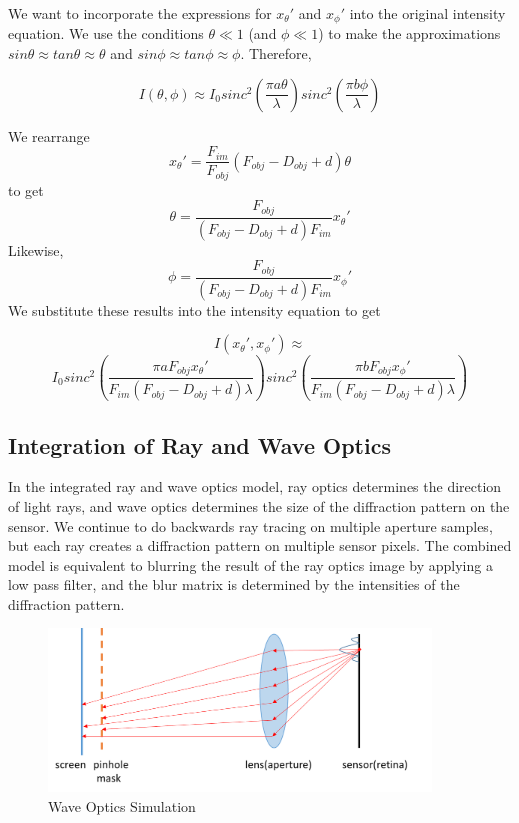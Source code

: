 We want to incorporate the expressions for $x_{\theta}'$ and $x_{\phi}'$ into the original intensity equation. We use the conditions $\theta \ll 1$ (and $\phi \ll 1$) to make the approximations $sin\theta \approx tan\theta \approx \theta$ and $sin\phi \approx tan\phi \approx \phi$. Therefore, 

$$I(\theta, \phi) \approx I_0 sinc^2(\frac{\pi a \theta}{\lambda}) sinc^2(\frac{\pi b \phi}{\lambda})$$

We rearrange $$x_{\theta}' = \frac{F_{im}}{F_{obj}} (F_{obj} - D_{obj} + d) \theta $$ to get $$\theta =  \frac{F_{obj}} {(F_{obj} - D_{obj} + d)F_{im}} x_{\theta}'$$ Likewise,  $$\phi =  \frac{F_{obj}} {(F_{obj} - D_{obj} + d)F_{im}} x_{\phi}'$$ We substitute these results into the intensity equation to get

$$I(x_{\theta}', x_{\phi}') \approx $$ $$I_0 sinc^2 (\frac{\pi a F_{obj} x_{\theta}'}{F_{im}(F_{obj} - D_{obj} + d)\lambda}) sinc^2 (\frac{\pi b F_{obj} x_{\phi}'}{F_{im}(F_{obj} - D_{obj} + d)\lambda})$$

\subsection{Integration of Ray and Wave Optics}

In the integrated ray and wave optics model, ray optics determines the direction of light rays, and wave optics determines the size of the diffraction pattern on the sensor. We continue to do backwards ray tracing on multiple aperture samples, but each ray creates a diffraction pattern on multiple sensor pixels. The combined model is equivalent to blurring the result of the ray optics image by applying a low pass filter, and the blur matrix is determined by the intensities of the diffraction pattern. 

\begin{figure}[ht]
  \centering
  \includegraphics[width=4in]{chapters/chapter8/images/Diffract_Simulation.png}
  \caption{Wave Optics Simulation}
  \label{fig:ferrari}
\end{figure}


